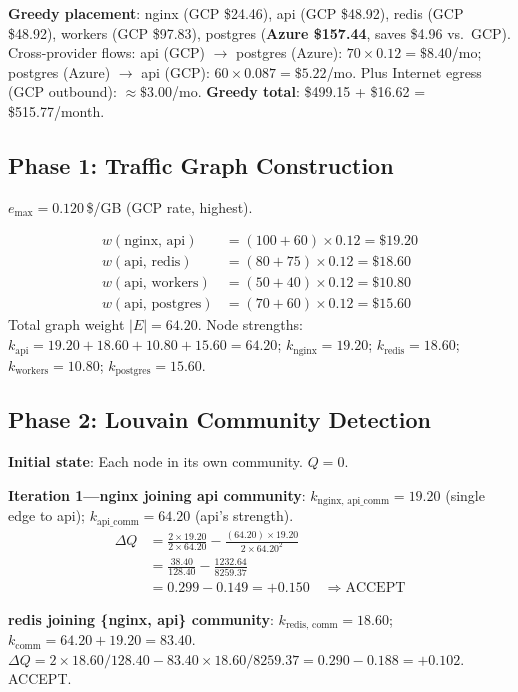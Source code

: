\documentclass[10pt,journal]{IEEEtran}
\begin{document}
\textbf{Greedy placement}:
nginx (GCP \$24.46), api (GCP \$48.92), redis (GCP \$48.92),
workers (GCP \$97.83), postgres (\textbf{Azure \$157.44}, saves \$4.96 vs.\ GCP).
Cross-provider flows: api (GCP) $\to$ postgres (Azure): $70 \times 0.12 = \$8.40$/mo;
postgres (Azure) $\to$ api (GCP): $60 \times 0.087 = \$5.22$/mo.
Plus Internet egress (GCP outbound): $\approx \$3.00$/mo.
\textbf{Greedy total}: \$499.15 + \$16.62 = \$515.77/month.

\subsection{Phase 1: Traffic Graph Construction}

$e_{\max} = 0.120$\,\$/GB (GCP rate, highest).

\begin{align*}
w(\text{nginx, api})    &= (100+60)\times 0.12 = \$19.20\\
w(\text{api, redis})    &= (80+75)\times 0.12  = \$18.60\\
w(\text{api, workers})  &= (50+40)\times 0.12  = \$10.80\\
w(\text{api, postgres}) &= (70+60)\times 0.12  = \$15.60
\end{align*}
Total graph weight $|E| = 64.20$.
Node strengths: $k_{\text{api}} = 19.20+18.60+10.80+15.60 = 64.20$;
$k_{\text{nginx}} = 19.20$; $k_{\text{redis}} = 18.60$;
$k_{\text{workers}} = 10.80$; $k_{\text{postgres}} = 15.60$.

\subsection{Phase 2: Louvain Community Detection}

\textbf{Initial state}: Each node in its own community. $Q = 0$.

\textbf{Iteration 1---nginx joining api community}:
$k_{\text{nginx, api\_comm}} = 19.20$ (single edge to api);
$k_{\text{api\_comm}} = 64.20$ (api's strength).
\begin{align*}
\Delta Q &= \frac{2 \times 19.20}{2 \times 64.20} -
            \frac{(64.20) \times 19.20}{2 \times 64.20^2}\\
         &= \frac{38.40}{128.40} - \frac{1232.64}{8259.37}\\
         &= 0.299 - 0.149 = +0.150\quad\Rightarrow\text{ACCEPT}
\end{align*}

\textbf{redis joining \{nginx, api\} community}:
$k_{\text{redis, comm}} = 18.60$; $k_{\text{comm}} = 64.20+19.20 = 83.40$.
$\Delta Q = 2\times18.60/128.40 - 83.40\times18.60/8259.37 = 0.290 - 0.188 = +0.102$.
ACCEPT.
\end{document}
